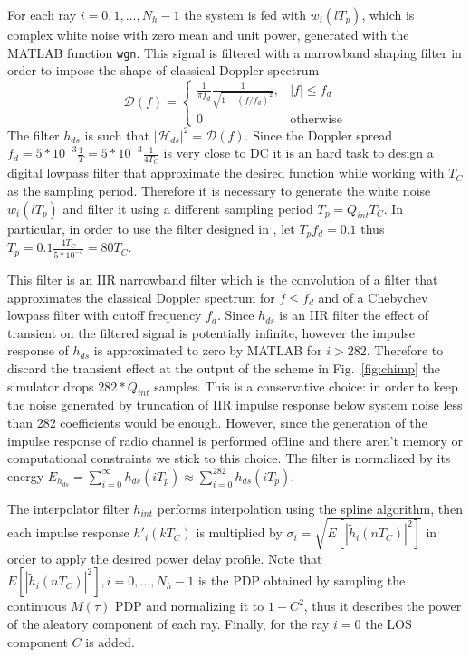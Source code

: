 \documentclass[10pt]{article}
\begin{document}
For each ray $i = 0, 1, \dots, N_h -1$ the system is fed with $w_i(lT_p)$, which is complex white noise with zero mean and unit power, generated with the MATLAB function \texttt{wgn}. This signal is filtered with a narrowband shaping filter in order to impose the shape of classical Doppler spectrum
\begin{equation}
  \mathcal{D}(f) =  \begin{cases} \frac{1}{\pi f_d} \frac{1}{\sqrt{1-(f/f_d)^2}}, & |f| \le f_d \\
                                  0                                              & \mbox{otherwise}
                   \end{cases}
\end{equation}
The filter $h_{ds}$ is such that $|\mathcal{H}_{ds}|^2 = \mathcal{D}(f)$. Since the Doppler spread $f_d = 5*10^{-3}\frac{1}{T} = 5*10^{-3}\frac{1}{4T_C}$ is very close to DC it is an hard task to design a digital lowpass filter that approximate the desired function while working with $T_C$ as the sampling period. Therefore it is necessary to generate the white noise $w_i(lT_p)$ and filter it using a different sampling period $T_p = Q_{int}T_C$. In particular, in order to use the filter designed in \cite{anachugg}, let $T_p f_d = 0.1$ thus $T_p = 0.1 \frac{4 T_C}{5*10^{-3}} = 80 T_C$.

This filter is an IIR narrowband filter which is the convolution of a filter that approximates the classical Doppler spectrum for $f \le f_d$ and of a Chebychev lowpass filter with cutoff frequency $f_d$. Since $h_{ds}$ is an IIR filter the effect of transient on the filtered signal is potentially infinite, however the impulse response of $h_{ds}$ is approximated to zero by MATLAB for $i > 282$. Therefore to discard the transient effect at the output of the scheme in Fig.~\ref{fig:chimp} the simulator drops $282*Q_{int}$ samples. This is a conservative choice: in order to keep the noise generated by truncation of IIR impulse response below system noise less than 282 coefficients would be enough. However, since the generation of the impulse response of radio channel is performed offline and there aren't memory or computational constraints we stick to this choice. The filter is normalized by its energy $E_{h_{ds}} = \sum_{i = 0}^{\infty} h_{ds} (iT_p) \approx \sum_{i = 0}^{282} h_{ds} (iT_p)$.

The interpolator filter $h_{int}$ performs interpolation using the spline algorithm, then each impulse response $h'_i(kT_C)$ is multiplied by $\sigma_i = \sqrt{E[|\tilde{h}_i(nT_C)|^2]}$ in order to apply the desired power delay profile. Note that $E[|\tilde{h}_i(nT_C)|^2], i = 0, \dots, N_h -1$ is the PDP obtained by sampling the continuous $M(\tau)$ PDP and normalizing it to $1-C^2$, thus it describes the power of the aleatory component of each ray. Finally, for the ray $i = 0$ the LOS component $C$ is added.
\end{document}
